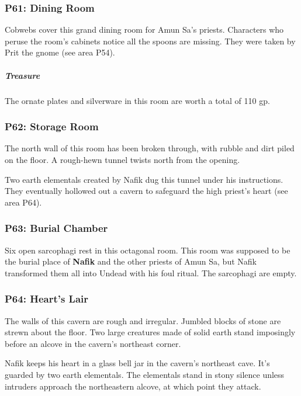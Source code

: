 \documentclass[10pt,a4paper,twoside,bg=print,twocolumn,openany,nodeprecatedcode]{dndbook}
\begin{document}
\subsubsection{P61: Dining Room}
Cobwebs cover this grand dining room for Amun Sa's priests. Characters who peruse the room's cabinets notice all the spoons are missing. They were taken by Prit the gnome (see area P54).

\subparagraph{Treasure}
The ornate plates and silverware in this room are worth a total of 110 gp.

\subsubsection{P62: Storage Room}
\begin{DndReadAloud}{}
The north wall of this room has been broken through, with rubble and dirt piled on the floor. A rough-hewn tunnel twists north from the opening.

\end{DndReadAloud}

Two earth elementals created by Nafik dug this tunnel under his instructions. They eventually hollowed out a cavern to safeguard the high priest's heart (see area P64).

\subsubsection{P63: Burial Chamber}
Six open sarcophagi rest in this octagonal room. This room was supposed to be the burial place of \textbf{Nafik} and the other priests of Amun Sa, but Nafik transformed them all into Undead with his foul ritual. The sarcophagi are empty.

\subsubsection{P64: Heart's Lair}
\begin{DndReadAloud}{}
The walls of this cavern are rough and irregular. Jumbled blocks of stone are strewn about the floor. Two large creatures made of solid earth stand imposingly before an alcove in the cavern's northeast corner.

\end{DndReadAloud}

Nafik keeps his heart in a glass bell jar in the cavern's northeast cave. It's guarded by two earth elementals. The elementals stand in stony silence unless intruders approach the northeastern alcove, at which point they attack.
\end{document}
